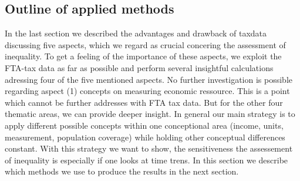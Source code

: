 \documentclass[twoside]{article}\usepackage[]{graphicx}\usepackage[]{color}
\begin{document}
\begin{multicols}{2}
\subsection{Outline of applied methods}


In the last section we described the advantages and drawback of taxdata discussing five aspects, which we regard as crucial concering the assessment of inequality. To get a feeling of the importance of these aspects, we exploit the FTA-tax data as far as possible and perform several insightful calculations adressing four of the five mentioned aspects. No further investigation is possible regarding aspect (1) concepts on measuring economic ressource. This is a point which cannot be further addresses with FTA tax data. But for the other four thematic areas, we can provide deeper insight. In general our main strategy is to apply different possible concepts within one conceptional area (income, units, measurement, population coverage) while holding other conceptual differences constant. With this strategy we want to show, the sensitiveness the assessement of inequality is especially if one looks at time trens.  In this section we  describe which methods we use to produce the results in the next section.











\end{multicols}
\end{document}
